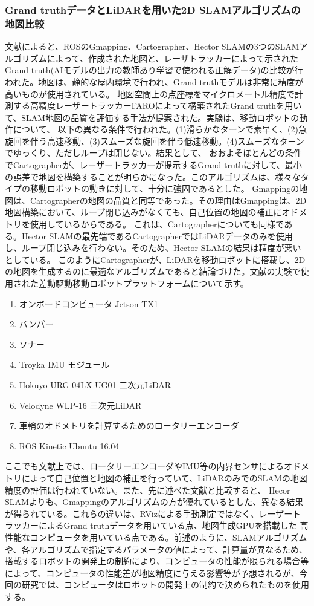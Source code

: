 \subsubsection{Grand truthデータとLiDARを用いた2D SLAMアルゴリズムの地図比較}
文献\cite{slam:grandtruth}によると、ROSのGmapping、Cartographer、Hector SLAMの3つのSLAMアルゴリズムによって、作成された地図と、レーザトラッカーによって示された
Grand truth(AIモデルの出力の教師あり学習で使われる正解データ)の比較が行われた。地図は、静的な屋内環境で行われ、Grand truthモデルは非常に精度が高いものが使用されている。
地図空間上の点座標をマイクロメートル精度で計測する高精度レーザートラッカーFAROによって構築されたGrand truthを用いて、SLAM地図の品質を評価する手法が提案された。実験は、移動ロボットの動作について、
以下の異なる条件で行われた。(1)滑らかなターンで素早く、(2)急旋回を伴う高速移動、(3)スムーズな旋回を伴う低速移動。(4)スムーズなターンでゆっくり、ただしループは閉じない。結果として、
おおよそほとんどの条件でCartographerが、レーザートラッカーが提示するGrand truthに対して、最小の誤差で地図を構築することが明らかになった。このアルゴリズムは、様々なタイプの移動ロボットの動きに対して、十分に強固であるとした。
Gmappingの地図は、Cartographerの地図の品質と同等であった。その理由はGmappingは、2D地図構築において、ループ閉じ込みがなくても、自己位置の地図の補正にオドメトリを使用しているからである。
これは、Cartographerについても同様である。Hector SLAMの最先端であるCartographerではLiDARデータのみを使用し、ループ閉じ込みを行わない。そのため、Hector SLAMの結果は精度が悪いとしている。
このようにCartographerが、LiDARを移動ロボットに搭載し、2Dの地図を生成するのに最適なアルゴリズムであると結論づけた。文献\cite{slam:grandtruth}の実験で使用された差動駆動移動ロボットプラットフォームについて示す。

\begin{enumerate}
  \item オンボードコンピュータ Jetson TX1
  \item バンパー
  \item ソナー
  \item Troyka IMU モジュール
  \item Hokuyo URG-04LX-UG01 二次元LiDAR
  \item Velodyne WLP-16 三次元LiDAR
  \item 車輪のオドメトリを計算するためのロータリーエンコーダ
  \item ROS Kinetic Ubuntu 16.04
\end{enumerate}

ここでも文献上では、ロータリーエンコーダやIMU等の内界センサによるオドメトリによって自己位置と地図の補正を行っていて、LiDARのみでのSLAMの地図精度の評価は行われていない。また、先に述べた文献と比較すると、
Hecor SLAMよりも、Gmappingのアルゴリズムの方が優れているとした、異なる結果が得られている。これらの違いは、RVizによる手動測定ではなく、レーザートラッカーによるGrand truthデータを用いている点、地図生成GPUを搭載した
高性能なコンピュータを用いている点である。前述のように、SLAMアルゴリズムや、各アルゴリズムで指定するパラメータの値によって、計算量が異なるため、搭載するロボットの開発上の制約により、コンピュータの性能が限られる場合等によって、コンピュータの性能差が地図精度に与える影響等が予想されるが、今回の研究では、コンピュータはロボットの開発上の制約で決められたものを使用する。

